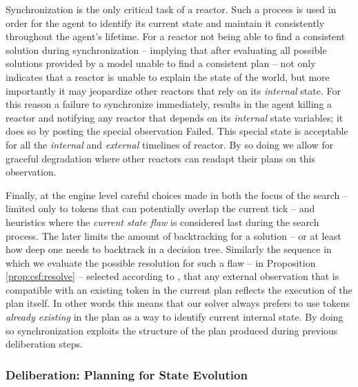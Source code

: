 Synchronization is the only critical task of a reactor. Such a process
is used in order for the agent to identify its current state and
maintain it consistently throughout the agent's lifetime. For a
reactor not being able to find a consistent solution during
synchronization -- implying that after evaluating all possible
solutions provided by a model  unable to find a
consistent plan -- not only indicates that a reactor is unable to
explain the state of the world, but more importantly it may jeopardize
other reactors that rely on its {\em internal} state. For this reason
a failure to synchronize immediately, results in the \rx agent killing
a reactor and notifying any reactor that depends on its {\em internal}
state variables; it does so by posting the special observation
\textsf{Failed}. This special state is acceptable for all the {\em
  internal} and {\em external} timelines of  \eu reactor.
By so doing we allow for graceful degradation where other reactors can
readapt their plans on  this observation.

Finally, at the engine level careful choices  made in
both the focus of the search -- limited only to tokens that can
potentially overlap the current tick -- and heuristics where the {\em
  current state flaw} is considered last during the search
process. The later limits the amount of backtracking for a solution --
or at least how deep one needs to backtrack in a decision tree.
Similarly the sequence in which we evaluate the possible resolution
for such a flaw --  in Proposition
\ref{prop:csf:resolve} --  selected according to
, that any external observation that is
compatible with an existing token in the current plan reflects the
execution of the plan itself. In other words this means that our
solver always prefers to use tokens \emph{already existing} in the
plan as a way to identify current internal state. By doing so
synchronization exploits the structure of the plan produced during
previous deliberation steps.


\subsubsection{Deliberation: Planning for  State Evolution}
\label{sec:arch:plan}

